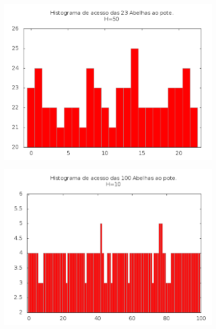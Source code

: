 \documentclass[12pt,a4paper]{article}
\begin{document}
\begin{figure}[!htb]
\centering
\includegraphics[width=0.7\paperwidth]{./graficos/histograma_23_1_50_100_100.png}
\label{Rotulo}
\end{figure}

\begin{figure}[!htb]
\centering
\includegraphics[width=0.7\paperwidth]{./graficos/histograma_100_3_10_100_10.png}
\label{Rotulo}
\end{figure}
\end{document}
